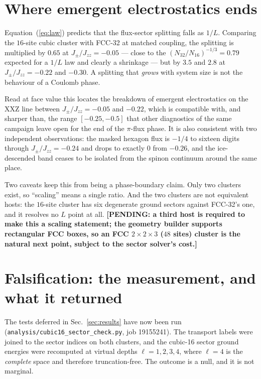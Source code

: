 \documentclass[aps,prb,preprint,amsmath,amssymb,superscriptaddress,
longbibliography,floatfix]{revtex4-2}
\newcommand{\Jzz}{J_{zz}}
\newcommand{\Jpm}{J_{\pm}}
\newcommand{\pending}[1]{{\color{red}\textbf{[PENDING: #1]}}}
\begin{document}
\section{Where emergent electrostatics ends}
\label{sec:breakdown}

Equation~(\ref{eq:law}) predicts that the flux-sector splitting falls as $1/L$.
Comparing the $16$-site cubic cluster with FCC-32 at matched coupling, the
splitting is multiplied by $0.65$ at $\Jpm/\Jzz=-0.05$ --- close to the
$(N_{32}/N_{16})^{-1/3}=0.79$ expected for a $1/L$ law and clearly a shrinkage
--- but by $3.5$ and $2.8$ at $\Jpm/\Jzz=-0.22$ and $-0.30$.  A splitting that
\emph{grows} with system size is not the behaviour of a Coulomb phase.

Read at face value this locates the breakdown of emergent electrostatics on the
XXZ line between $\Jpm/\Jzz=-0.05$ and $-0.22$, which is compatible with, and
sharper than, the range $[-0.25,-0.5]$ that other diagnostics of the same
campaign leave open for the end of the $\pi$-flux phase.  It is also consistent
with two independent observations: the masked hexagon flux is $-1/4$ to sixteen
digits through $\Jpm/\Jzz=-0.24$ and drops to exactly $0$ from $-0.26$, and the
ice-descended band ceases to be isolated from the spinon continuum around the
same place.

Two caveats keep this from being a phase-boundary claim.  Only two clusters
exist, so ``scaling'' means a single ratio.  And the two clusters are not
equivalent hosts: the $16$-site cluster has six degenerate ground sectors
against FCC-32's one, and it resolves no $L$ point at all.  \pending{a third
host is required to make this a scaling statement; the geometry builder
supports rectangular FCC boxes, so an FCC $2\times2\times3$ ($48$ sites)
cluster is the natural next point, subject to the sector solver's cost.}


\section{Falsification: the measurement, and what it returned}
\label{sec:falsified}

The tests deferred in Sec.~\ref{sec:results} have now been run
(\texttt{analysis/cubic16\_sector\_check.py}, job 19155241).  The transport
labels were joined to the sector indices on both clusters, and the cubic-16
sector ground energies were recomputed at virtual depths $\ell=1,2,3,4$, where
$\ell=4$ is the \emph{complete} space and therefore truncation-free.  The
outcome is a null, and it is not marginal.
\end{document}
